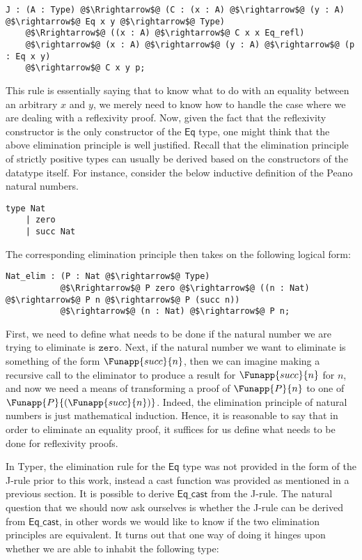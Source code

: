 \documentclass[12pt,twoside,maitrise]{dms}
\theoremstyle{definition}
\numberwithin{equation}{section}
\numberwithin{table}{chapter}
\numberwithin{figure}{chapter}
\newcommand\kw[1] {\textsf{#1}}
\newcommand\id[1] {\texttt{#1}}
\begin{document}
\begin{verbatim}
J : (A : Type) @$\Rrightarrow$@ (C : (x : A) @$\rightarrow$@ (y : A) @$\rightarrow$@ Eq x y @$\rightarrow$@ Type)
    @$\Rrightarrow$@ ((x : A) @$\rightarrow$@ C x x Eq_refl)
    @$\rightarrow$@ (x : A) @$\rightarrow$@ (y : A) @$\rightarrow$@ (p : Eq x y)
    @$\rightarrow$@ C x y p;
\end{verbatim}

This rule is essentially saying that to know what to do with an
equality between an arbitrary $x$ and $y$, we merely need to know how to handle
the case where we are dealing with a reflexivity proof. Now, given the fact that the
reflexivity constructor is the only constructor of the $\kw{Eq}$ type, one might
think that the above elimination principle is well justified. Recall that
the elimination principle of strictly positive types\cite{abbott2005containers} can
usually be derived based on the constructors of the datatype itself. For
instance, consider the below inductive definition of the Peano natural numbers.

\begin{verbatim}
type Nat
    | zero
    | succ Nat
\end{verbatim}

The corresponding elimination principle then takes on the following logical form:

\begin{verbatim}
Nat_elim : (P : Nat @$\rightarrow$@ Type)
           @$\Rrightarrow$@ P zero @$\rightarrow$@ ((n : Nat) @$\rightarrow$@ P n @$\rightarrow$@ P (succ n))
           @$\rightarrow$@ (n : Nat) @$\rightarrow$@ P n;
\end{verbatim}

First, we need to define what needs to be done if the natural number we are
trying to eliminate is $\id{zero}$. Next, if the natural number we want to
eliminate is something of the form $\Funapp{succ}{n}$, then we can imagine
making a recursive call to the eliminator to produce a result for
$\Funapp{succ}{n}$ for $n$, and now we need a means of transforming a proof of
$\Funapp{P}{n}$ to one of $\Funapp{P}{(\Funapp{succ}{n})}$. Indeed, the
elimination principle of natural numbers is just mathematical induction. Hence,
it is reasonable to say that in order to eliminate an equality proof, it
suffices for us define what needs to be done for reflexivity proofs.

In Typer, the elimination rule for the $\kw{Eq}$ type was not provided in the
form of the J-rule prior to this work, instead a cast function was provided as
mentioned in a previous section. It is possible to derive $\kw{Eq\_cast}$ from
the J-rule. The natural question that we should now ask ourselves is whether the
J-rule can be derived from $\kw{Eq\_cast}$, in other words we would like to know
if the two elimination principles are equivalent. It turns out that one way of
doing it hinges upon whether we are able to inhabit the following type:
\end{document}
